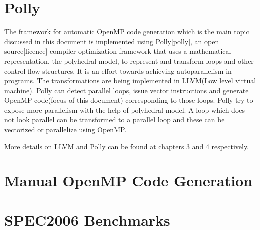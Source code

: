 \section{Polly}
The framework for automatic OpenMP code generation which is the main topic 
discussed in this document is implemented using Polly[polly],
an open source[licence] compiler  optimization framework that uses a mathematical
 representation, the polyhedral model, to represent and transform loops and other
 control flow structures. It is an effort towards achieving autoparallelism in programs.
 The transformations are being implemented in LLVM(Low level virtual machine). 
Polly can detect parallel loops, issue vector instructions and generate OpenMP code(focus of 
this document) corresponding to those loops. Polly try to expose more parallelism
with the help of polyhedral model. A loop which does not look parallel can be transformed
to a parallel loop and these can be vectorized or parallelize using OpenMP.

More details on LLVM and Polly can be found at chapters 3 and 4 respectively.

\section{Manual OpenMP Code Generation}

\section{SPEC2006 Benchmarks}
